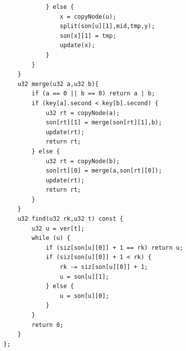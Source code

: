 \begin{lstlisting}
            } else {
                x = copyNode(u);
                split(son[u][1],mid,tmp,y);
                son[x][1] = tmp;
                update(x);
            }
        }
    }
    u32 merge(u32 a,u32 b){
        if (a == 0 || b == 0) return a | b;
        if (key[a].second < key[b].second) {
            u32 rt = copyNode(a);
            son[rt][1] = merge(son[rt][1],b);
            update(rt);
            return rt;
        } else {
            u32 rt = copyNode(b);
            son[rt][0] = merge(a,son[rt][0]);
            update(rt);
            return rt;
        }
    }
    u32 find(u32 rk,u32 t) const {
        u32 u = ver[t];
        while (u) {
            if (siz[son[u][0]] + 1 == rk) return u;
            if (siz[son[u][0]] + 1 < rk) {
                rk -= siz[son[u][0]] + 1;
                u = son[u][1];
            } else {
                u = son[u][0];
            }
        }
        return 0;
    }
};
\end{lstlisting}